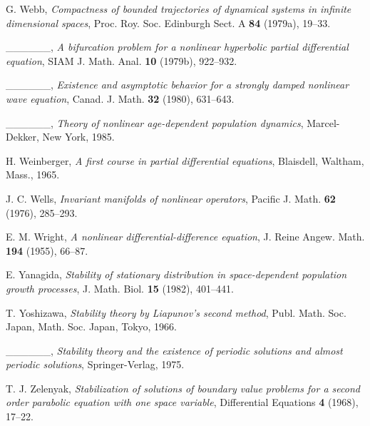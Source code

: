 \documentclass{surv-l}
\theoremstyle{plain}
\theoremstyle{definition}
\numberwithin{equation}{section}
\numberwithin{figure}{chapter}
\begin{document}
\begin{thebibliography}{}
G. Webb, \emph{Compactness of bounded trajectories of dynamical systems in infinite dimensional spaces}, Proc. Roy. Soc. Edinburgh Sect. A \textbf{84} (1979a), 19--33.

 \_\_\_\_\_\_, \emph{A bifurcation problem for a nonlinear hyperbolic partial differential equation}, SIAM J. Math. Anal. \textbf{10} (1979b), 922--932.

 \_\_\_\_\_\_, \emph{Existence and asymptotic behavior for a strongly damped nonlinear wave equation}, Canad. J. Math. \textbf{32} (1980), 631--643.

 \_\_\_\_\_\_, \emph{Theory of nonlinear age-dependent population dynamics}, Marcel-Dekker, New York, 1985.

H. Weinberger, \emph{A first course in partial differential equations}, Blaisdell, Waltham, Mass., 1965.

J. C. Wells, \emph{Invariant manifolds of nonlinear operators}, Pacific J. Math. \textbf{62}
(1976), 285--293.

E. M. Wright, \emph{A nonlinear differential-difference equation}, J. Reine Angew. Math. \textbf{194} (1955), 66--87.

E. Yanagida, \emph{Stability of stationary distribution in space-dependent population}
\emph{growth processes}, J. Math. Biol. \textbf{15} (1982), 401--441.

T. Yoshizawa, \emph{Stability theory by Liapunov's second method}, Publ. Math. Soc. Japan, Math. Soc. Japan, Tokyo, 1966.

 \_\_\_\_\_\_, \emph{Stability theory and the existence of periodic solutions and almost periodic solutions}, Springer-Verlag, 1975.

T. J. Zelenyak, \emph{Stabilization of solutions of boundary value problems for a second order parabolic equation with one space variable}, Differential Equations \textbf{4} (1968), 17--22.
\end{thebibliography}


\printindex
\end{document}
